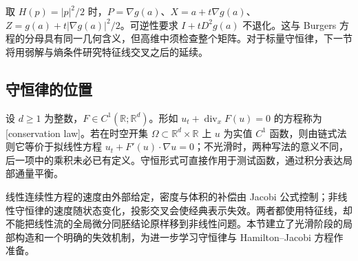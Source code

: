取 \(H(p)=|p|^2/2\) 时，\(P=\nabla g(a)\)、\(X=a+t\nabla g(a)\)、\(Z=g(a)+t|\nabla g(a)|^2/2\)。可逆性要求 \(I+tD^2g(a)\) 不退化。这与 Burgers 方程的分母具有同一几何含义，但高维中须检查整个矩阵。对于标量守恒律，下一节将用弱解与熵条件研究特征线交叉之后的延续。

\subsection{守恒律的位置}
\label{b2:subsec:070405}

设 \(d\geq1\) 为整数，\(F\in C^1(\mathbb R;\mathbb R^d)\)。形如 \(u_t+\operatorname{div}_xF(u)=0\) 的方程称为[conservation law]。若在时空开集 \(\Omega\subset\mathbb R^d\times\mathbb R\) 上 \(u\) 为实值 \(C^1\) 函数，则由链式法则它等价于拟线性方程 \(u_t+F'(u)\cdot\nabla u=0\)；不光滑时，两种写法的意义不同，后一项中的乘积未必已有定义。守恒形式可直接作用于测试函数，通过积分表达局部通量平衡。

\ProseParagraphBreak

线性连续性方程的速度由外部给定，密度与体积的补偿由 Jacobi 公式控制；非线性守恒律的速度随状态变化，投影交叉会使经典表示失效。两者都使用特征线，却不能把线性流的全局微分同胚结论原样移到非线性问题。本节建立了光滑阶段的局部构造和一个明确的失效机制，为进一步学习守恒律与 Hamilton--Jacobi 方程作准备。

